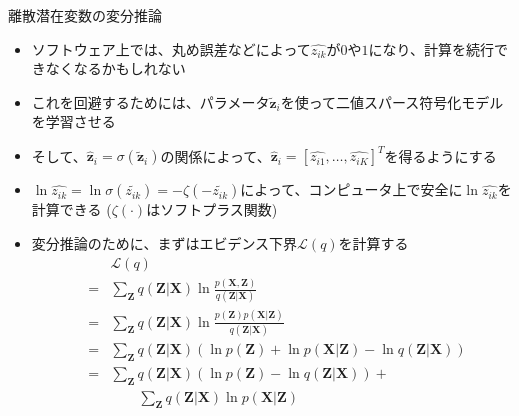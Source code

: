 \documentclass[dvipdfmx,notheorems,t]{beamer}
\begin{document}
\begin{frame}{離散潜在変数の変分推論}
\begin{itemize}
\begin{itemize}
		\item ソフトウェア上では、丸め誤差などによって$\widehat{z_{ik}}$が$0$や$1$になり、計算を続行できなくなるかもしれない
		\item これを回避するためには、パラメータ$\widetilde{\bm{z}}_i$を使って二値スパース符号化モデルを学習させる
		\item そして、$\widehat{\bm{z}}_i = \sigma(\widetilde{\bm{z}}_i)$の関係によって、$\widehat{\bm{z}}_i = \left[ \widehat{z_{i1}}, \ldots, \widehat{z_{iK}} \right]^T$を得るようにする
		\item $\ln \widehat{z_{ik}} = \ln \sigma(\widetilde{z_{ik}}) = -\zeta(-\widetilde{z_{ik}})$によって、コンピュータ上で安全に$\ln \widehat{z_{ik}}$を計算できる ($\zeta(\cdot)$はソフトプラス関数)
		\newline
		
		\item 変分推論のために、まずはエビデンス下界$\mathcal{L}(q)$を計算する
		\begin{eqnarray}
			&& \mathcal{L}(q) \nonumber \\
			&=& \sum_{\bm{Z}} q(\bm{Z} | \bm{X}) \ln \frac{p(\bm{X}, \bm{Z})}{q(\bm{Z} | \bm{X})} \\
			&=& \sum_{\bm{Z}} q(\bm{Z} | \bm{X}) \ln \frac{p(\bm{Z}) p(\bm{X} | \bm{Z})}{q(\bm{Z} | \bm{X})} \\
			&=& \sum_{\bm{Z}} q(\bm{Z} | \bm{X}) \left( \ln p(\bm{Z}) + \ln p(\bm{X} | \bm{Z}) - \ln q(\bm{Z} | \bm{X}) \right) \\
			&=& \sum_{\bm{Z}} q(\bm{Z} | \bm{X}) \left( \ln p(\bm{Z}) - \ln q(\bm{Z} | \bm{X}) \right) + \nonumber \\
			&& \qquad \sum_{\bm{Z}} q(\bm{Z} | \bm{X}) \ln p(\bm{X} | \bm{Z})
		\end{eqnarray}
		

\end{itemize}
\end{itemize}
\end{frame}
\end{document}
